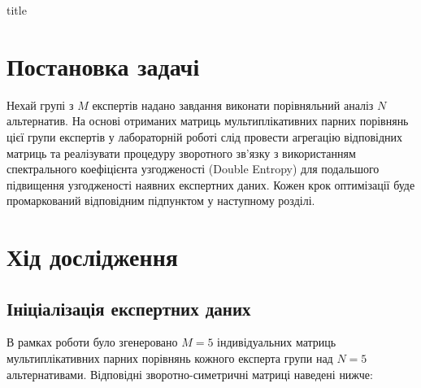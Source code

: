 \documentclass{mathreport}
\begin{document}




{title}

\tableofcontents

\newpage

\section*{Постановка задачі}

Нехай групі з $M$ експертів надано завдання виконати порівняльний аналіз $N$ альтернатив. На основі отриманих матриць мультиплікативних парних порівнянь цієї групи експертів у лабораторній роботі слід провести агрегацію відповідних матриць та реалізувати процедуру зворотного зв'язку з використанням спектрального коефіцієнта узгодженості (Double Entropy) для подальшого підвищення узгодженості наявних експертних даних. Кожен крок оптимізації буде промаркований відповідним підпунктом у наступному розділі.

\section*{Хід дослідження}

\subsection{Ініціалізація експертних даних}

В рамках роботи було згенеровано $M=5$ індивідуальних матриць мультиплікативних парних порівнянь кожного експерта групи над $N=5$ альтернативами. Відповідні зворотно-симетричні матриці наведені нижче:
\end{document}
